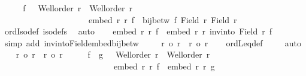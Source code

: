 \begin{isabellebody}
\ \ \isamarkupfalse%
\ \isamarkupfalse%
\ f\ \ {}{\isacharcolon}{\kern0pt}\ {\isachardoublequoteopen}Well{\isacharunderscore}{\kern0pt}order\ r\ {\isasymand}\ Well{\isacharunderscore}{\kern0pt}order\ r{\isacharprime}{\kern0pt}\ {\isasymand}\isanewline
\ \ \ \ \ \ \ \ \ \ \ \ \ \ \ \ \ \ \ \ \ embed\ r\ r{\isacharprime}{\kern0pt}\ f\ {\isasymand}\ bij{\isacharunderscore}{\kern0pt}betw\ f\ {\isacharparenleft}{\kern0pt}Field\ r{\isacharparenright}{\kern0pt}\ {\isacharparenleft}{\kern0pt}Field\ r{\isacharprime}{\kern0pt}{\isacharparenright}{\kern0pt}{\isachardoublequoteclose}\isanewline
\ \ \isamarkupfalse%
\ ordIso{\isacharunderscore}{\kern0pt}def\ iso{\isacharunderscore}{\kern0pt}defs\ \isamarkupfalse%
\ auto\isanewline
\ \ \isamarkupfalse%
\ {\isachardoublequoteopen}embed\ r\ r{\isacharprime}{\kern0pt}\ f\ {\isasymand}\ embed\ r{\isacharprime}{\kern0pt}\ r\ {\isacharparenleft}{\kern0pt}inv{\isacharunderscore}{\kern0pt}into\ {\isacharparenleft}{\kern0pt}Field\ r{\isacharparenright}{\kern0pt}\ f{\isacharparenright}{\kern0pt}{\isachardoublequoteclose}\isanewline
\ \ \isamarkupfalse%
\ {\isacharparenleft}{\kern0pt}simp\ add{\isacharcolon}{\kern0pt}\ inv{\isacharunderscore}{\kern0pt}into{\isacharunderscore}{\kern0pt}Field{\isacharunderscore}{\kern0pt}embed{\isacharunderscore}{\kern0pt}bij{\isacharunderscore}{\kern0pt}betw{\isacharparenright}{\kern0pt}\isanewline
\ \ \isamarkupfalse%
\ \ {\isachardoublequoteopen}r\ {\isasymle}o\ r{\isacharprime}{\kern0pt}\ {\isasymand}\ r{\isacharprime}{\kern0pt}\ {\isasymle}o\ r{\isachardoublequoteclose}\isanewline
\ \ \isamarkupfalse%
\ ordLeq{\isacharunderscore}{\kern0pt}def\ \isamarkupfalse%
\ {}\ \isamarkupfalse%
\ auto\isanewline
{}\isamarkupfalse%
\isanewline
\ \ \isamarkupfalse%
\ {\isachardoublequoteopen}r\ {\isasymle}o\ r{\isacharprime}{\kern0pt}\ {\isasymand}\ r{\isacharprime}{\kern0pt}\ {\isasymle}o\ r{\isachardoublequoteclose}\isanewline
\ \ \isamarkupfalse%
\ \isamarkupfalse%
\ f\ \ g\ \ {}{\isacharcolon}{\kern0pt}\ {\isachardoublequoteopen}Well{\isacharunderscore}{\kern0pt}order\ r\ {\isasymand}\ Well{\isacharunderscore}{\kern0pt}order\ r{\isacharprime}{\kern0pt}\ {\isasymand}\isanewline
\ \ \ \ \ \ \ \ \ \ \ \ \ \ \ \ \ \ \ \ \ \ \ \ \ \ \ embed\ r\ r{\isacharprime}{\kern0pt}\ f\ {\isasymand}\ embed\ r{\isacharprime}{\kern0pt}\ r\ g{\isachardoublequoteclose}\isanewline

\end{isabellebody}
